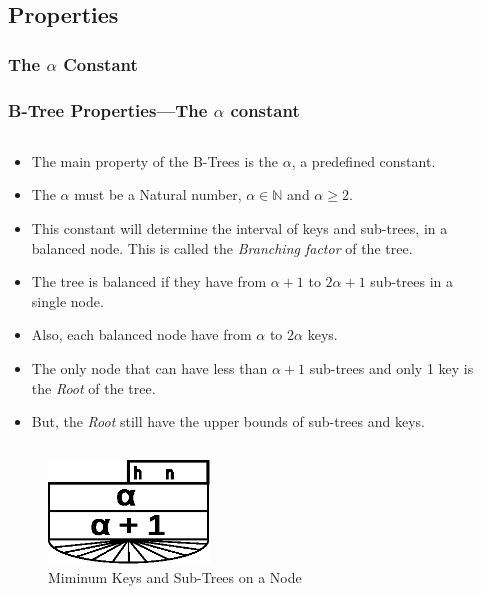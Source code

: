 \begin{frame}
    \subsection{Properties}
    \subsubsection{The \(\alpha\) Constant}
    \frametitle{B-Tree Properties---The \(\alpha\) constant}
    \begin{columns}
        \begin{column}{\textlecolumn}
            \begin{block}{}
                \begin{itemize}
                    \item The main property of the B-Trees is the \(\alpha\), a predefined constant.
                    \item The \(\alpha\) must be a Natural number, \(\alpha \in \mathbb{N}\) and \(\alpha \geq 2\).
                    \item This constant will determine the interval of keys and sub-trees, in a balanced node. This is called the \emph{Branching factor} of the tree.
                    \item The tree is balanced if they have from \(\alpha + 1\) to \(2\alpha + 1\) sub-trees in a single node.
                    \item Also, each balanced node have from \(\alpha\) to \(2\alpha\) keys.
                    \item The only node that can have less than \(\alpha + 1\) sub-trees and only 1 key is the \emph{Root} of the tree. 
                    \item But, the \emph{Root} still have the upper bounds of sub-trees and keys.
                \end{itemize}
            \end{block}
        \end{column}
        \begin{column}{\textricolumn}
        \end{column}
    \end{columns}
    \begin{columns}
        \begin{column}{0.5\textwidth}
                \begin{figure}
                    \includegraphics[width=0.45\textwidth]{resources/made/min_node.eps}
                    \caption[]{Miminum Keys and Sub-Trees on a Node}
                \end{figure}
        \end{column}
        \begin{column}{0.5\textwidth}


\end{column}
\end{columns}
\end{frame}
